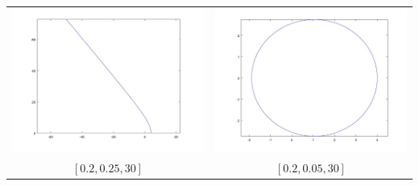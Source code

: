 \documentclass[12pt]{article}
\theoremstyle{homework}
\begin{document}
\begin{enumerate}[(a)]
\begin{tabular}{c c}
\includegraphics[scale=.3]{../octave/f6.jpg} & \includegraphics[scale=.3]{../octave/f7.jpg}\\
$[0.2,0.25,30]$ & $[0.2,0.05,30]$\\

\end{tabular}
\end{enumerate}
\end{document}
